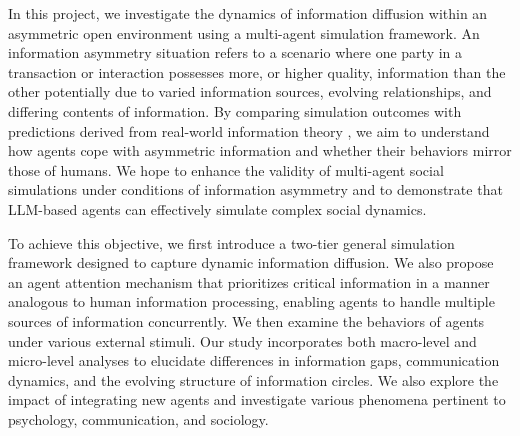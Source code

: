 

In this project, we investigate the dynamics of information diffusion within an asymmetric open environment using a multi-agent simulation framework. An information asymmetry situation refers to a scenario where one party in a transaction or interaction possesses more, or higher quality, information than the other potentially due to varied information sources, evolving relationships, and differing contents of information. By comparing simulation outcomes with predictions derived from real-world information theory \cite{b62,b64}, we aim to understand how agents cope with asymmetric information and whether their behaviors mirror those of humans. We hope to enhance the validity of multi-agent social simulations under conditions of information asymmetry and to demonstrate that LLM-based agents can effectively simulate complex social dynamics.

To achieve this objective, we first introduce a two-tier general simulation framework designed to capture dynamic information diffusion. We also propose an agent attention mechanism \cite{b51,b49} that prioritizes critical information in a manner analogous to human information processing, enabling agents to handle multiple sources of information concurrently. We then examine the behaviors of agents under various external stimuli. Our study incorporates both macro-level and micro-level analyses to elucidate differences in information gaps, communication dynamics, and the evolving structure of information circles. We also explore the impact of integrating new agents and investigate various phenomena pertinent to psychology, communication, and sociology.


